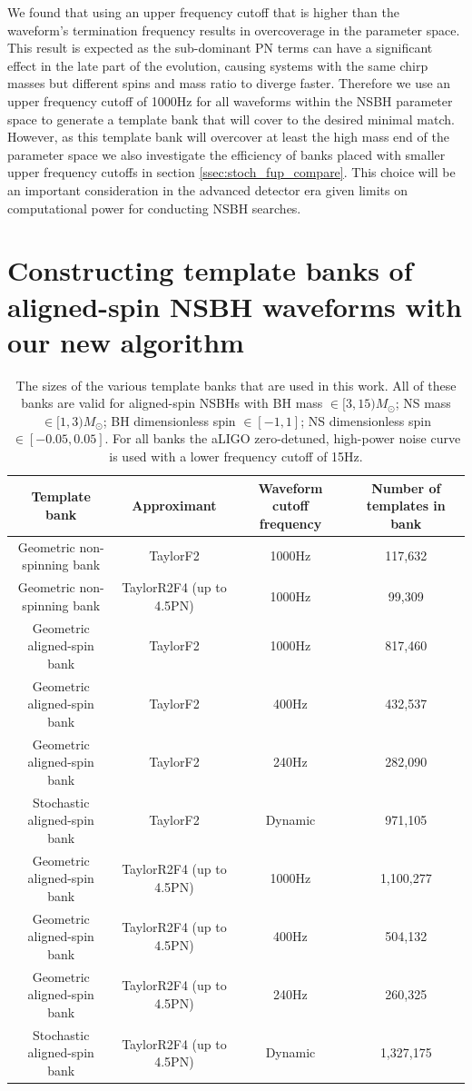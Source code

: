 We found that using an upper frequency cutoff that is higher than the waveform's
termination frequency results in overcoverage in the parameter space. This 
result is expected as the sub-dominant \ac{PN} terms can have a
significant effect in the late part of the evolution, causing
systems with the same chirp masses but different spins and mass ratio to diverge
faster. Therefore we use an upper frequency cutoff of 1000Hz for all waveforms
within the \ac{NSBH} parameter space to generate a template bank that will cover
to the desired minimal match. However, as this template bank will overcover
at least the high mass end of the parameter space we also investigate the
efficiency of banks placed with smaller upper frequency cutoffs in section
\ref{ssec:stoch_fup_compare}. This choice will be an important consideration
in the advanced detector era given limits on computational power for conducting
\ac{NSBH} searches.

\section{Constructing template banks of aligned-spin NSBH waveforms with our 
new algorithm}
\label{sec:bank_construction}

\begin{table}
    \centering
    \begin{minipage}[l]{2.0\columnwidth}
    \centering
\begin{tabular}{c | c | c | c}
 Template bank & Approximant & Waveform cutoff frequency & Number of templates
in bank \\ \hline \hline
 Geometric non-spinning bank & TaylorF2 & 1000Hz & 117,632 \\
 Geometric non-spinning bank & TaylorR2F4 (up to 4.5PN) & 1000Hz & 99,309 \\
 Geometric aligned-spin bank & TaylorF2 & 1000Hz & 817,460 \\
 Geometric aligned-spin bank & TaylorF2 & 400Hz & 432,537 \\
 Geometric aligned-spin bank & TaylorF2 & 240Hz & 282,090 \\
 Stochastic aligned-spin bank & TaylorF2 & Dynamic & 971,105 \\
 Geometric aligned-spin bank & TaylorR2F4 (up to 4.5PN) & 1000Hz & 1,100,277 \\
 Geometric aligned-spin bank & TaylorR2F4 (up to 4.5PN) & 400Hz & 504,132 \\
 Geometric aligned-spin bank & TaylorR2F4 (up to 4.5PN) & 240Hz & 260,325 \\
 Stochastic aligned-spin bank & TaylorR2F4 (up to 4.5PN) & Dynamic & 1,327,175\\
\end{tabular}
\caption{\label{tab:banksizes}
The sizes of the various template banks that are used in this work. All of these
banks are valid for
aligned-spin \acp{NSBH} with BH mass $\in [3,15) M_{\odot}$; NS mass $\in 
[1,3)M_{\odot}$; BH
dimensionless spin $\in [-1,1]$;
NS dimensionless spin $\in [-0.05,0.05]$. For all banks the \ac{aLIGO}
zero-detuned, high-power noise curve is used with a lower frequency cutoff of
15Hz.
}
\end{minipage}
\end{table}

